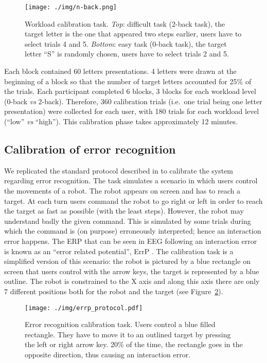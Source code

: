 \documentclass[]{sigchi}
\begin{document}
\begin{figure}
\centering
\texttt{[image: ./img/n-back.png]}
\caption{Workload calibration task. \emph{Top}: difficult task (2-back
task), the target letter is the one that appeared two steps earlier,
users have to select trials 4 and 5. \emph{Bottom}: easy task (0-back
task), the target letter ``S'' is randomly chosen, users have to select
trials 2 and 5.}\label{fig:n-back}
\end{figure}

Each block contained 60 letters presentations. 4 letters were drawn at
the beginning of a block so that the number of target letters accounted
for 25\% of the trials. Each participant completed 6 blocks, 3 blocks
for each workload level (0-back \emph{vs} 2-back). Therefore, 360
calibration trials (i.e.~one trial being one letter presentation) were
collected for each user, with 180 trials for each workload level
(``low'' \emph{vs} ``high''). This calibration phase takes approximately
12 minutes.

\subsection{Calibration of error
recognition}\label{calibration-of-error-recognition}

We replicated the standard protocol described in \citep{Ferrez2008} to
calibrate the system regarding error recognition. The task simulates a
scenario in which users control the movements of a robot. The robot
appears on screen and has to reach a target. At each turn users command
the robot to go right or left in order to reach the target as fast as
possible (with the least steps). However, the robot may understand badly
the given command. This is simulated by some trials during which the
command is (on purpose) erroneously interpreted; hence an interaction
error happens. The ERP that can be seen in EEG following an interaction
error is known as an ``error related potential'', ErrP
\citep{Ferrez2008}. The calibration task is a simplified version of this
scenario: the robot is pictured by a blue rectangle on screen that users
control with the arrow keys, the target is represented by a blue
outline. The robot is constrained to the X axis and along this axis
there are only 7 different positions both for the robot and the target
(see Figure~\ref{fig:errp-task}).

\begin{figure}
\centering
\texttt{[image: ./img/errp\_protocol.pdf]}
\caption{Error recognition calibration task. Users control a blue filled
rectangle. They have to move it to an outlined target by pressing the
left or right arrow key. 20\% of the time, the rectangle goes in the
opposite direction, thus causing an interaction
error.}\label{fig:errp-task}
\end{figure}
\end{document}
